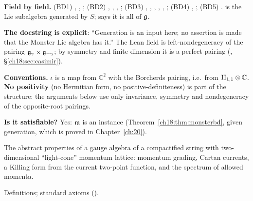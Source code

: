 \begin{dictionary}
\textbf{Field by field.}  (BD1) , , ; (BD2)
, , , ; (BD3) ,
, , , , ; (BD4)
, ; (BD5) .   is the Lie
subalgebra generated by $S$;  says it is all of $\mathfrak{g}$.

\textbf{The docstring is explicit}: ``Generation is an input here; no assertion is made that the Monster Lie
algebra has it.''  The Lean field  is left-nondegeneracy of the pairing
$\mathfrak{g}_\gamma\times\mathfrak{g}_{-\gamma}$; by symmetry and finite dimension it is a perfect pairing
(, \S\ref{ch18:sec:casimir}).

\textbf{Conventions.}  $\iota$ is a map from $\mathbb C^2$ with the Borcherds pairing, i.e.\ from $\mathrm{II}_{1,1}\otimes\mathbb C$.
\textbf{No positivity} (no Hermitian form, no positive-definiteness) is part of the structure: the arguments below use only
invariance, symmetry and nondegeneracy of the opposite-root pairings.

\textbf{Is it satisfiable?}  Yes: $\mathfrak{m}$ is an instance (Theorem~\ref{ch18:thm:monsterbd}, given generation, which is
proved in Chapter~\ref{ch:20}).
\end{dictionary}
\begin{physics}
The abstract properties of a gauge algebra of a compactified string with two-dimensional ``light-cone'' momentum
lattice: momentum grading, Cartan currents, a Killing form from the current two-point function, and the
spectrum of allowed momenta.
\end{physics}
\begin{status}Definitions; standard axioms ().\end{status}

